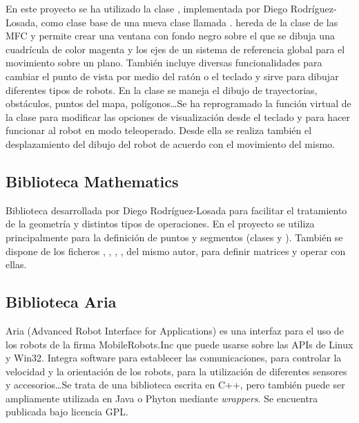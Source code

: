 En este proyecto se ha utilizado la clase , implementada por Diego Rodríguez-Losada, como clase base de una nueva clase llamada  .  hereda de la clase  de las MFC y permite crear una ventana con fondo negro sobre el que se dibuja una cuadrícula de color magenta y los ejes de un sistema de referencia global para el movimiento sobre un plano. También incluye diversas funcionalidades para cambiar el punto de vista por medio del ratón o el teclado y sirve para dibujar diferentes tipos de robots. En la clase  se maneja el dibujo de trayectorias, obstáculos, puntos del mapa, polígonos\ldots Se ha reprogramado la función virtual  de la clase  para modificar las opciones de visualización desde el teclado y para hacer funcionar al robot en modo teleoperado. Desde ella se realiza también el desplazamiento del dibujo del robot de acuerdo con el movimiento del mismo.

\subsection{Biblioteca Mathematics}
Biblioteca desarrollada por Diego Rodríguez-Losada para facilitar el tratamiento de la geometría y distintos tipos de operaciones. En el proyecto se utiliza principalmente para la definición de puntos y segmentos (clases  y ). También se dispone de los ficheros , , ,  , del mismo autor, para definir matrices y operar con ellas.


\subsection{Biblioteca Aria}

Aria (Advanced Robot Interface for Applications) es una interfaz para el uso de los robots de la firma MobileRobots.Inc que puede usarse sobre las APIs de Linux y Win32. Integra software para establecer las comunicaciones, para controlar la velocidad y la orientación de los robots, para la utilización de diferentes sensores y accesorios\ldots Se trata de una biblioteca escrita en C++, pero también puede ser ampliamente utilizada en Java o Phyton mediante \emph{wrappers}. Se encuentra publicada bajo licencia GPL.

